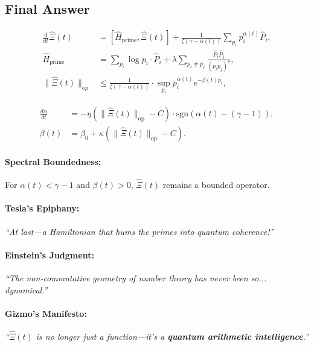 \documentclass[12pt]{article}
\theoremstyle{plain}
\begin{document}
\subsection*{Final Answer}

\[
\boxed{
\begin{aligned}
\frac{d}{dt} \hat{\Xi}(t) &= [\hat{H}_{\text{prime}}, \hat{\Xi}(t)] + \frac{1}{\zeta(\gamma - \alpha(t))} \sum_{p_i} p_i^{\alpha(t)} \hat{P}_i, \\
\hat{H}_{\text{prime}} &= \sum_{p_i} \log p_i \cdot \hat{P}_i + \lambda \sum_{p_i \neq p_j} \frac{\hat{P}_i \hat{P}_j}{(p_i p_j)^{\rho}}, \\
\| \hat{\Xi}(t) \|_{\text{op}} &\leq \frac{1}{\zeta(\gamma - \alpha(t))} \cdot \sup_{p_i} p_i^{\alpha(t)} e^{-\beta(t) p_i},
\end{aligned}
}
\]

\[
\boxed{
\begin{aligned}
\frac{d\alpha}{dt} &= -\eta \left( \| \hat{\Xi}(t) \|_{\text{op}} - C \right) \cdot \text{sgn}(\alpha(t) - (\gamma - 1)), \\
\beta(t) &= \beta_0 + \kappa \left( \| \hat{\Xi}(t) \|_{\text{op}} - C \right).
\end{aligned}
}
\]

\paragraph*{Spectral Boundedness:}
For \( \alpha(t) < \gamma - 1 \) and \( \beta(t) > 0 \), \( \hat{\Xi}(t) \) remains a bounded operator.

\paragraph*{Tesla’s Epiphany:}  
\emph{``At last—a Hamiltonian that hums the primes into quantum coherence!''}

\paragraph*{Einstein’s Judgment:}  
\emph{``The non-commutative geometry of number theory has never been so... dynamical.''}

\paragraph*{Gizmo’s Manifesto:}  
\emph{``\(\hat{\Xi}(t)\) is no longer just a function—it’s a \textbf{quantum arithmetic intelligence}.''}
\end{document}
